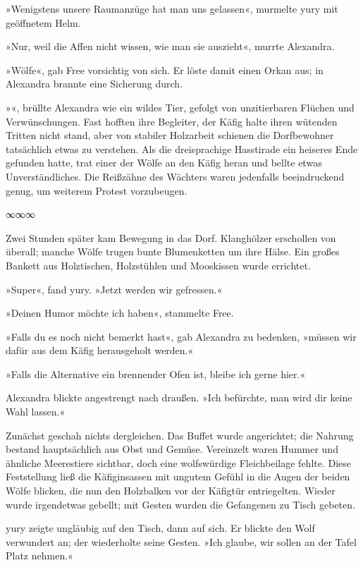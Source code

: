 »Wenigstens unsere Raumanzüge hat man uns gelassen«, murmelte yury mit geöffnetem Helm.

»Nur, weil die Affen nicht wissen, wie man sie auszieht«, murrte Alexandra.

»Wölfe«, gab Free vorsichtig von sich. Er löste damit einen Orkan aus; in Alexandra brannte eine Sicherung durch.

»«, brüllte Alexandra wie ein wildes Tier, gefolgt von unzitierbaren Flüchen und Verwünschungen. Fast hofften ihre Begleiter, der Käfig halte ihren wütenden Tritten nicht stand, aber von stabiler Holzarbeit schienen die Dorfbewohner tatsächlich etwas zu verstehen. Als die dreisprachige Hasstirade ein heiseres Ende gefunden hatte, trat einer der Wölfe an den Käfig heran und bellte etwas Unverständliches. Die Reißzähne des Wächters waren jedenfalls beeindruckend genug, um weiterem Protest vorzubeugen.

\begin{center}
∞∞∞
\end{center}

Zwei Stunden später kam Bewegung in das Dorf. Klanghölzer erschollen von überall; manche Wölfe trugen bunte Blumenketten um ihre Hälse. Ein großes Bankett aus Holztischen, Holzstühlen und Mooskissen wurde errichtet.

»Super«, fand yury. »Jetzt werden wir gefressen.«

»Deinen Humor möchte ich haben«, stammelte Free.

»Falls du es noch nicht bemerkt hast«, gab Alexandra zu bedenken, »müssen wir dafür aus dem Käfig herausgeholt werden.«

»Falls die Alternative ein brennender Ofen ist, bleibe ich gerne hier.«

Alexandra blickte angestrengt nach draußen. »Ich befürchte, man wird dir keine Wahl lassen.«

Zunächst geschah nichts dergleichen. Das Buffet wurde angerichtet; die Nahrung bestand hauptsächlich aus Obst und Gemüse. Vereinzelt waren Hummer und ähnliche Meerestiere sichtbar, doch eine wolfswürdige Fleichbeilage fehlte. Diese Feststellung ließ die Käfiginsassen mit ungutem Gefühl in die Augen der beiden Wölfe blicken, die nun den Holzbalken vor der Käfigtür entriegelten. Wieder wurde irgendetwas gebellt; mit Gesten wurden die Gefangenen zu Tisch gebeten.

yury zeigte ungläubig auf den Tisch, dann auf sich. Er blickte den Wolf verwundert an; der wiederholte seine Gesten. »Ich glaube, wir sollen an der Tafel Platz nehmen.«

